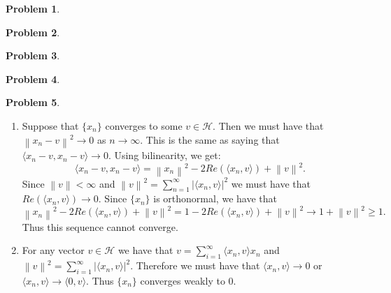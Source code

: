 \documentclass[12pt, a4paper]{article}
\newtheorem{problem}{Problem}
\theoremstyle{definition}
\newcommand{\penum}{ \begin{enumerate}[label=\bf(\alph*), leftmargin=0pt]}
\newcommand{\epenum}{ \end{enumerate} }
\newcommand{\lan}{\langle}
\newcommand{\ran}{\rangle}
\newcommand{\norm}[1]{\left\lVert#1\right\rVert}
\newcommand{\inn}[1]{\lan#1\ran}
\begin{document}
\newpage
\begin{problem}
\end{problem}
\newpage
\begin{problem}
\end{problem}
\newpage
\begin{problem}
\end{problem}
\newpage
\begin{problem}
\end{problem}
\newpage
\begin{problem}
\end{problem}
\penum
\item 
Suppose that $\{x_n\}$ converges to some $v \in \mathcal{H}$. Then we must have that $\norm{x_n - v}^2\to 0$ as $n \to \infty$. This is the same as saying that $\inn{x_n - v, x_n-v} \to 0$. Using bilinearity, we get:
$$\inn{x_n - v, x_n-v}  = \norm{x_n}^2 - 2 Re(\inn{x_n,v}) + \norm{v}^2. $$ Since $\norm{v} <\infty$ and $\norm{v}^2 = \sum_{n=1}^\infty |\inn{x_n,v}|^2$ we must have that $Re(\inn{x_n,v}) \to 0$. Since $\{x_n\}$ is orthonormal, we have that 
$$\norm{x_n}^2 - 2Re(\inn{x_n,v}) + \norm{v}^2 = 1 - 2 Re(\inn{x_n,v}) + \norm{v}^2 \to 1 + \norm{v}^2 \geq 1.$$
Thus this sequence cannot converge. 
\item For any vector $v\in \mathcal{H}$ we have that $v = \sum_{i=1}^\infty \inn{x_n,v}x_n$ and $\norm{v}^2 = \sum_{i=1}^\infty |\inn{x_n,v}|^2$. Therefore we must have that $\inn{x_n,v} \to 0$ or $\inn{x_n,v} \to \inn{0,v}$. Thus $\{x_n\}$ converges weakly to $0$. 

\epenum
\end{document}
